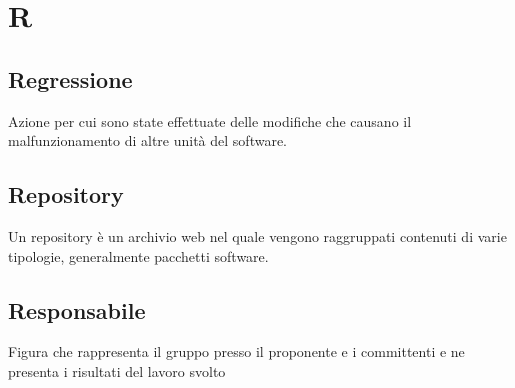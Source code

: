 \section{R}
	\subsection{Regressione}  
		Azione per cui sono state effettuate delle modifiche che causano il malfunzionamento di altre unità del software.
	\subsection{Repository}  
		Un repository è un archivio web nel quale vengono raggruppati contenuti di varie tipologie, generalmente pacchetti software.
	\subsection{Responsabile}  
		Figura che rappresenta il gruppo presso il proponente e i committenti e ne presenta i risultati del lavoro svolto


\newpage